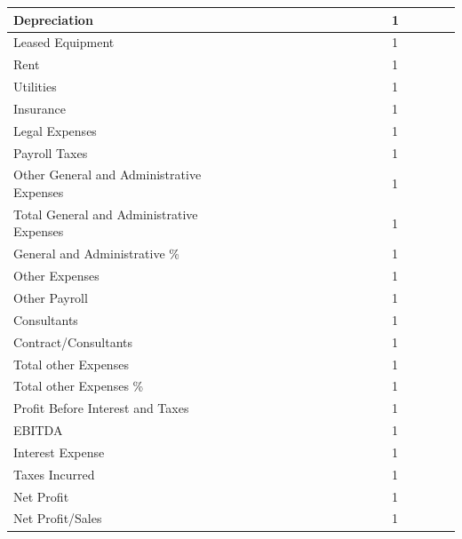 \documentclass[11pt,titlepage]{article}
\begin{document}
\begin{landscape}
\begin{scriptsize}
\begin{tabular}{ | l | l | l | l | l | l | l | l | l | l | l | l | l | l | l | l | l | l |}
  Depreciation & & & & & & & & & & & & & 1\\\hline
  Leased Equipment & & & & & & & & & & & & & 1\\\hline
  Rent & & & & & & & & & & & & & 1\\\hline
  Utilities & & & & & & & & & & & & & 1\\\hline
  Insurance & & & & & & & & & & & & & 1\\\hline
  Legal Expenses & & & & & & & & & & & & & 1\\\hline
  Payroll Taxes & & & & & & & & & & & & & 1\\\hline
  Other General and Administrative Expenses & & & & & & & & & & & & & 1\\\hline
  Total General and Administrative Expenses & & & & & & & & & & & & & 1\\\hline
  General and Administrative \% & & & & & & & & & & & & & 1\\\hline
  Other Expenses & & & & & & & & & & & & & 1\\\hline
  Other Payroll & & & & & & & & & & & & & 1\\\hline
  Consultants & & & & & & & & & & & & & 1\\\hline
  Contract/Consultants & & & & & & & & & & & & & 1\\\hline
  Total other Expenses & & & & & & & & & & & & & 1\\\hline
  Total other Expenses \% & & & & & & & & & & & & & 1\\\hline
  Profit Before Interest and Taxes & & & & & & & & & & & & & 1\\\hline
  EBITDA & & & & & & & & & & & & & 1\\\hline
  Interest Expense & & & & & & & & & & & & & 1\\\hline
  Taxes Incurred & & & & & & & & & & & & & 1\\\hline
  Net Profit & & & & & & & & & & & & & 1\\\hline
  Net Profit/Sales & & & & & & & & & & & & & 1\\\hline
\end{tabular}
\end{scriptsize}
\end{landscape}
\newpage
\thispagestyle{empty}
\end{document}
